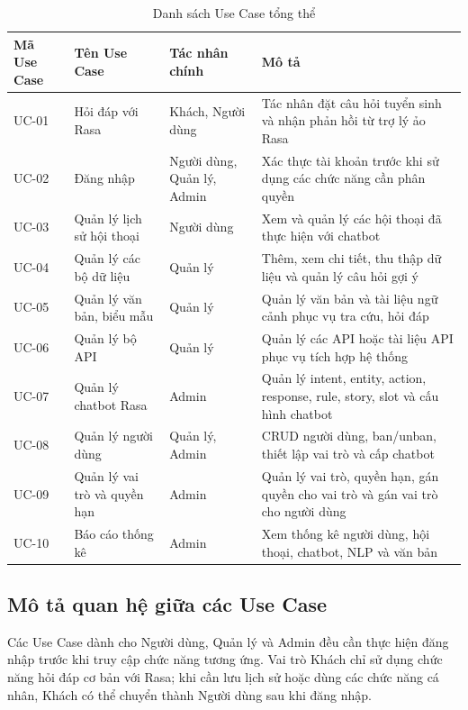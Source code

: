 \begin{table}[H]
\centering
\caption{Danh sách Use Case tổng thể}
\label{tab:usecase_list}
\begin{tabular}{|p{1.5cm}|p{4.2cm}|p{3cm}|p{6.3cm}|}
\hline
\textbf{Mã Use Case} & \textbf{Tên Use Case} & \textbf{Tác nhân chính} & \textbf{Mô tả} \\ \hline
UC-01 & Hỏi đáp với Rasa & Khách, Người dùng & Tác nhân đặt câu hỏi tuyển sinh và nhận phản hồi từ trợ lý ảo Rasa \\ \hline
UC-02 & Đăng nhập & Người dùng, Quản lý, Admin & Xác thực tài khoản trước khi sử dụng các chức năng cần phân quyền \\ \hline
UC-03 & Quản lý lịch sử hội thoại & Người dùng & Xem và quản lý các hội thoại đã thực hiện với chatbot \\ \hline
UC-04 & Quản lý các bộ dữ liệu & Quản lý & Thêm, xem chi tiết, thu thập dữ liệu và quản lý câu hỏi gợi ý \\ \hline
UC-05 & Quản lý văn bản, biểu mẫu & Quản lý & Quản lý văn bản và tài liệu ngữ cảnh phục vụ tra cứu, hỏi đáp \\ \hline
UC-06 & Quản lý bộ API & Quản lý & Quản lý các API hoặc tài liệu API phục vụ tích hợp hệ thống \\ \hline
UC-07 & Quản lý chatbot Rasa & Admin & Quản lý intent, entity, action, response, rule, story, slot và cấu hình chatbot \\ \hline
UC-08 & Quản lý người dùng & Quản lý, Admin & CRUD người dùng, ban/unban, thiết lập vai trò và cấp chatbot \\ \hline
UC-09 & Quản lý vai trò và quyền hạn & Admin & Quản lý vai trò, quyền hạn, gán quyền cho vai trò và gán vai trò cho người dùng \\ \hline
UC-10 & Báo cáo thống kê & Admin & Xem thống kê người dùng, hội thoại, chatbot, NLP và văn bản \\ \hline
\end{tabular}
\end{table}

\subsection{Mô tả quan hệ giữa các Use Case}

Các Use Case dành cho Người dùng, Quản lý và Admin đều cần thực hiện đăng nhập trước khi truy cập chức năng tương ứng. Vai trò Khách chỉ sử dụng chức năng hỏi đáp cơ bản với Rasa; khi cần lưu lịch sử hoặc dùng các chức năng cá nhân, Khách có thể chuyển thành Người dùng sau khi đăng nhập.

